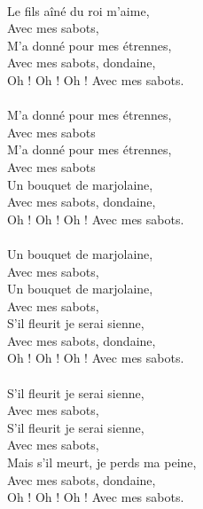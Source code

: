 \\Le fils aîné du roi m'aime,
\\Avec mes sabots,
\\M'a donné pour mes étrennes,
\\Avec mes sabots, dondaine,
\\Oh ! Oh ! Oh ! Avec mes sabots.
\\\\M'a donné pour mes étrennes,
\\Avec mes sabots
\\M'a donné pour mes étrennes,
\\Avec mes sabots
\\Un bouquet de marjolaine,
\\Avec mes sabots, dondaine,
\\Oh ! Oh ! Oh ! Avec mes sabots.
\\\\Un bouquet de marjolaine,
\\Avec mes sabots,
\\Un bouquet de marjolaine,
\\Avec mes sabots,
\\S'il fleurit je serai sienne,
\\Avec mes sabots, dondaine,
\\Oh ! Oh ! Oh ! Avec mes sabots.
\\\\S'il fleurit je serai sienne,
\\Avec mes sabots,
\\S'il fleurit je serai sienne,
\\Avec mes sabots,
\\Mais s'il meurt, je perds ma peine,
\\Avec mes sabots, dondaine,
\\Oh ! Oh ! Oh ! Avec mes sabots. 

\breakpage